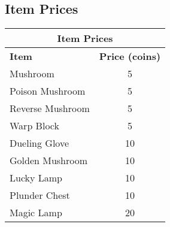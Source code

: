 \documentclass{article}
\begin{document}
\subsection{Item Prices}
\begin{tabular}{|l|c|}
\hline
\multicolumn{2}{|c|}{\textbf{Item Prices}} \\
\hline
\textbf{Item} & \textbf{Price (coins)} \\
\hline
Mushroom & 5 \\ %
Poison Mushroom & 5 \\ %
Reverse Mushroom & 5 \\ %
Warp Block & 5 \\ %
Dueling Glove & 10 \\ %
Golden Mushroom & 10 \\ %
Lucky Lamp & 10 \\ %
Plunder Chest & 10 \\ %
Magic Lamp & 20 \\ %
\hline
\end{tabular}
\end{document}
